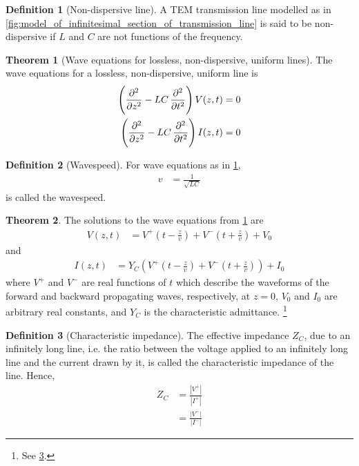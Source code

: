 \documentclass[titlepage, fleqn, a4paper, 12pt, twoside]{article}
\theoremstyle{definition}
\newtheorem{definition}{Definition}
\theoremstyle{theorem}
\newtheorem{theorem}{Theorem}
\begin{document}
\begin{definition}[Non-dispersive line]
	A TEM transmission line modelled as in \cref{fig:model_of_infinitesimal_section_of_transmission_line} is said to be non-dispersive if $L$ and $C$ are not functions of the frequency.
\end{definition}

\begin{theorem}[Wave equations for lossless, non-dispersive, uniform lines]
	The wave equations for a lossless, non-dispersive, uniform line is
	\begin{align*}
		\left( \dpd[2]{}{z} - L C \dpd[2]{}{t} \right) V(z,t) &= 0\\
		\left( \dpd[2]{}{z} - L C \dpd[2]{}{t} \right) I(z,t) &= 0
	\end{align*}
	\label{thm:wave_equations_for_lossless_non-dispersive_uniform_lines}
\end{theorem}

\begin{definition}[Wavespeed]
	For wave equations as in \cref{thm:wave_equations_for_lossless_non-dispersive_uniform_lines},
	\begin{align*}
		v &= \frac{1}{\sqrt{L C}}
	\end{align*}
	is called the wavespeed.
\end{definition}

\begin{theorem}
	The solutions to the wave equations from \cref{thm:wave_equations_for_lossless_non-dispersive_uniform_lines} are
	\begin{align*}
		V(z,t) &= V^+\left( t - \frac{z}{v} \right) + V^-\left( t + \frac{z}{v} \right) + V_0
	\end{align*}
	and
	\begin{align*}
		I(z,t) &= Y_C \left( V^+\left( t - \frac{z}{v} \right) + V^-\left( t + \frac{z}{v} \right) \right) + I_0
	\end{align*}
	where $V^+$ and $V^-$ are real functions of $t$ which describe the waveforms of the forward and backward propagating waves, respectively, at $z = 0$, $V_0$ and $I_0$ are arbitrary real constants, and $Y_C$ is the characteristic admittance.
	\footnote{See \cref{def:characteristic_impedance}.}
\end{theorem}

\begin{definition}[Characteristic impedance]
	The effective impedance $Z_C$, due to an infinitely long line, i.e. the ratio between the voltage applied to an infinitely long line and the current drawn by it, is called the characteristic impedance of the line.
	Hence,
	\begin{align*}
		Z_C &= \frac{\left| V^+ \right|}{\left| I^+ \right|}\\
		&= \frac{\left| V^- \right|}{\left| I^- \right|}
	\end{align*}
	\label{def:characteristic_impedance}
\end{definition}
\end{document}

